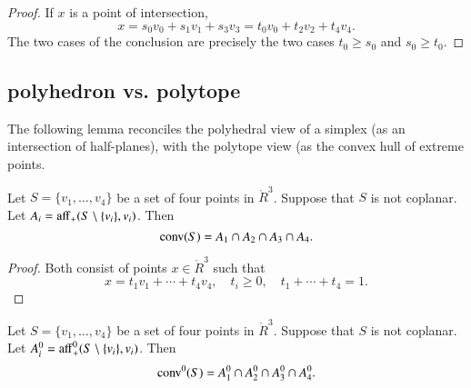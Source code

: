 \begin{tarskidata}
\begin{tarski}
\begin{proof} 
If $x$ is a point of intersection,
  $$
  x = s_0 v_0 + s_1 v_1 + s_3 v_ 3 = t_0 v_0 + t_2 v_2 + t_4 v_4.
  $$
The two cases of the conclusion are precisely the two cases
  $t_0\ge s_0$ and $s_0\ge t_0$.
\end{proof}
\end{tarski}





\begin{tarski}
\subsection{polyhedron vs. polytope}
The following lemma reconciles the polyhedral view of a simplex
(as an intersection of half-planes), with the polytope view (as
the convex hull of extreme points.


\begin{lemma} 
Let $S=\{v_1,\ldots, v_4\}$ be a set of four points
in $\ring{R}^3$.  Suppose that $S$ is not coplanar.
Let $A_i = {\operatorname{aff}}_+(S\setminus\{v_i\},v_i)$.
Then $${\operatorname{conv}}(S)  = A_1\cap A_2\cap A_3\cap A_4.$$
%
\end{lemma}

\begin{proof}
Both consist of points $x\in\ring{R}^3$ such that
  $$x = t_1 v_1 +\cdots+ t_4 v_4,\quad t_i\ge 0,\quad t_1+\cdots +t_4 =1.
  $$
\end{proof}
\end{tarski}



\begin{tarski}

\begin{lemma}
Let $S=\{v_1,\ldots, v_4\}$ be a set of four points
in $\ring{R}^3$.  Suppose that $S$ is not coplanar.
Let $A^0_i = {\operatorname{aff}}^0_+(S\setminus\{v_i\},v_i)$.
Then $${\operatorname{conv}}^0(S)  = A^0_1 \cap A^0_2 \cap A^0_3 \cap A^0_4.$$
\end{lemma}


\end{tarski}
\end{tarskidata}
